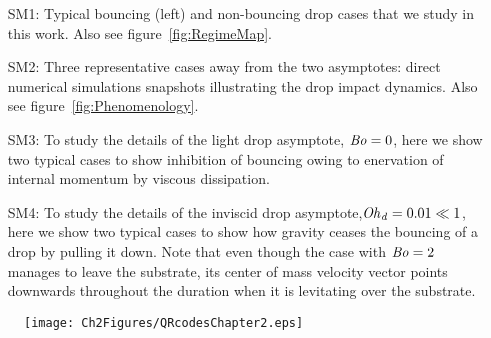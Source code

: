 \begin{subappendices}
	\begin{enumerate}
		\item[SM1:] Typical bouncing (left) and non-bouncing drop cases that we study in this work. Also see figure~\ref{fig:RegimeMap}.
		\item[SM2:] Three representative cases away from the two asymptotes: direct numerical simulations snapshots illustrating the drop impact dynamics.  Also see figure~\ref{fig:Phenomenology}.
		\item[SM3:] To study the details of the light drop asymptote, $\mathit{Bo} = 0$, here we show two typical cases to show inhibition of bouncing owing to enervation of internal momentum by viscous dissipation. 
		\item[SM4:] To study the details of the inviscid drop asymptote,$\mathit{Oh}_\mathit{d} = 0.01 \ll 1$, here we show two typical cases to show how gravity ceases the bouncing of a drop by pulling it down. Note that even though the case with $\mathit{Bo} = 2$ manages to leave the substrate, its center of mass velocity vector points downwards throughout the duration when it is levitating over the substrate. 
	\end{enumerate}

	\begin{figure*}
		\centering
		\texttt{[image: Ch2Figures/QRcodesChapter2.eps]}
	\end{figure*}
	
\end{subappendices}
